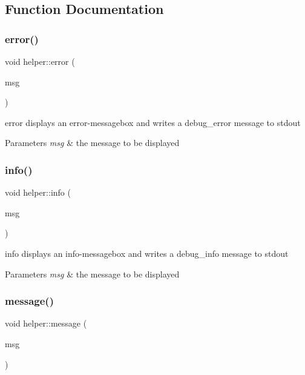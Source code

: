 \subsection{Function Documentation}
\mbox{\label{namespacehelper_a00e308809a0f9d76f3a0ba2ad5f3587c}} 
\subsubsection{\texorpdfstring{error()}{error()}}
{\footnotesize\ttfamily void helper\+::error (\begin{DoxyParamCaption}\item[{Q\+String}]{msg }\end{DoxyParamCaption})}



error displays an error-\/messagebox and writes a debug\+\_\+error message to stdout 


\begin{DoxyParams}{Parameters}
{\em msg} & the message to be displayed \\
\hline
\end{DoxyParams}
\mbox{\label{namespacehelper_a88e86d2fd14fc8354c1529beaa157f25}} 
\subsubsection{\texorpdfstring{info()}{info()}}
{\footnotesize\ttfamily void helper\+::info (\begin{DoxyParamCaption}\item[{Q\+String}]{msg }\end{DoxyParamCaption})}



info displays an info-\/messagebox and writes a debug\+\_\+info message to stdout 


\begin{DoxyParams}{Parameters}
{\em msg} & the message to be displayed \\
\hline
\end{DoxyParams}
\mbox{\label{namespacehelper_ab2cc8239d9bf2ae383474c0343205346}} 
\subsubsection{\texorpdfstring{message()}{message()}}
{\footnotesize\ttfamily void helper\+::message (\begin{DoxyParamCaption}\item[{Q\+String}]{msg }\end{DoxyParamCaption})}



